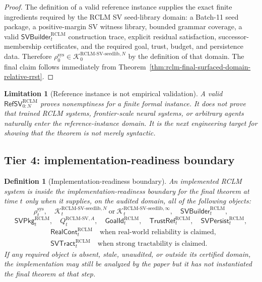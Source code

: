 \documentclass[11pt,a4paper]{article}
\newtheorem{definition}[theorem]{Definition}
\newtheorem{limitation}[theorem]{Limitation}
\newcommand{\Kcal}{\mathcal K}
\newcommand{\RCLM}{\mathrm{RCLM}}
\newcommand{\sys}{\mathrm{sys}}
\begin{document}
\begin{proof}
The definition of a valid reference instance supplies the exact finite ingredients required by the RCLM SV seed-library domain: a Batch-11 seed package, a positive-margin SV witness library, bounded grammar coverage, a valid \(\mathsf{SVBuilder}_t^{\RCLM}\) construction trace, explicit residual satisfaction, successor-membership certificates, and the required goal, trust, budget, and persistence data.  Therefore \(\rho_0^{\sys}\in\Kcal_0^{\RCLM\text{-}\mathrm{SV\mbox{-}seedlib},N}\) by the definition of that domain.  The final claim follows immediately from Theorem~\ref{thm:rclm-final-surfaced-domain-relative-rrst}.
\end{proof}

\begin{limitation}[Reference instance is not empirical validation]
A valid \(\mathsf{RefSV}_{0:N}^{\RCLM}\) proves nonemptiness for a finite formal instance.  It does not prove that trained RCLM systems, frontier-scale neural systems, or arbitrary agents naturally enter the reference-instance domain.  It is the next engineering target for showing that the theorem is not merely syntactic.
\end{limitation}

\subsection{Tier 4: implementation-readiness boundary}

\begin{definition}[Implementation-readiness boundary]
\label{def:rclm-implementation-readiness-boundary}
An implemented RCLM system is inside the implementation-readiness boundary for the final theorem at time \(t\) only when it supplies, on the audited domain, all of the following objects:
\[
\rho_t^{\sys},
\quad
\Kcal_t^{\RCLM\text{-}\mathrm{SV\mbox{-}seedlib},N}\ \text{or}\ \Kcal_t^{\RCLM\text{-}\mathrm{SV\mbox{-}seedlib},\infty},
\quad
\mathsf{SVBuilder}_t^{\RCLM},
\]
\[
\mathsf{SVPkg}_t^{\RCLM},
\quad
Q_t^{\RCLM\text{-}\mathrm{SV},A},
\quad
\mathsf{GoalId}_t^{\RCLM},
\quad
\mathsf{TrustRef}_t^{\RCLM},
\quad
\mathsf{SVPersist}_t^{\RCLM},
\]
\[
\begin{aligned}
&\mathsf{RealCont}_t^{\RCLM}
\quad\text{when real-world reliability is claimed},\\
&\mathsf{SVTract}_t^{\RCLM}
\quad\text{when strong tractability is claimed}.
\end{aligned}
\]
If any required object is absent, stale, unaudited, or outside its certified domain, the implementation may still be analyzed by the paper but it has not instantiated the final theorem at that step.
\end{definition}
\end{document}
